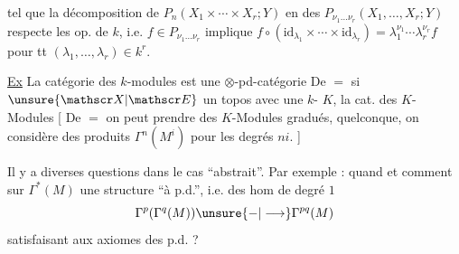 tel que la décomposition de
$P_n(X_1\times\cdots\times X_r;Y)$ en des $P_{\nu_1\ldots\nu_r}(X_1,\ldots,X_r;Y)$
respecte les op. de $k$, i.e. $f\in P_{\nu_1\ldots\nu_r}$
implique $f\circ(\mathrm{id}_{\lambda_1}\times\cdots\times\mathrm{id}_{\lambda_r})=\lambda_1^{\nu_1}\cdots\lambda_r^{\nu_r}f$
pour tt $(\lambda_1,\ldots,\lambda_r)\in k^r$.

\medskip\noindent\hfil\shortstack[r]{\rule{3cm}{0.4pt}\\[-0.9ex]\rule{0.9cm}{0.4pt}}\hfil\par

\uline{Ex} La catégorie des $k$-modules
est une $\otimes$-pd-catégorie
De $=$ si $\unsure{\mathscr X|\mathscr E}$ un topos avec une
$k$- $K$, la cat. des $K$-Modules
 [ De $=$ on peut prendre des
$K$-Modules gradués,  
quelconque,  on considère des
produits $\Gamma^n(M^i)$ pour les degrés $ni$. ]

\medskip\noindent\hfil\shortstack[r]{\rule{3cm}{0.4pt}\\[-0.9ex]\rule{0.9cm}{0.4pt}}\hfil\par

Il y a diverses questions dans le cas
``abstrait''. Par exemple : quand
et comment   sur
$\Gamma^*(M)$ une structure ``à p.d.'',
i.e. des hom de degré $1$
\[
\Gamma^p(\Gamma^q(M))\unsure{-|\longrightarrow}\Gamma^{pq}(M)
\]
satisfaisant aux axiomes des p.d. ?
